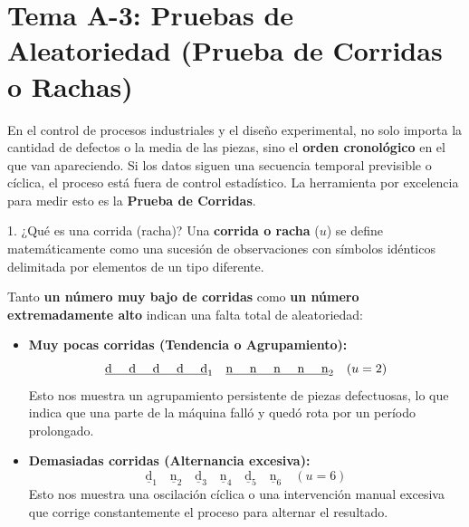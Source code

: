 \documentclass[11pt,a4paper]{article}
\begin{document}
\newpage
\section{Tema A-3: Pruebas de Aleatoriedad (Prueba de Corridas o Rachas)}

En el control de procesos industriales y el diseño experimental, no solo importa la cantidad de defectos o la media de las piezas, sino el \textbf{orden cronológico} en el que van apareciendo. Si los datos siguen una secuencia temporal previsible o cíclica, el proceso está fuera de control estadístico. La herramienta por excelencia para medir esto es la \textbf{Prueba de Corridas}.

\begin{subsection}{1. ¿Qué es una corrida (racha)?}
    Una \textbf{corrida o racha} ($u$) se define matemáticamente como una sucesión de observaciones con símbolos idénticos delimitada por elementos de un tipo diferente. 
    
    Tanto \textbf{un número muy bajo de corridas} como \textbf{un número extremadamente alto} indican una falta total de aleatoriedad:
    \begin{itemize}
        \item \textbf{Muy pocas corridas (Tendencia o Agrupamiento):} 
              \[ \underline{\text{d \quad d \quad d \quad d \quad d}}_{1} \quad \underline{\text{n \quad n \quad n \quad n \quad n}}_{2} \quad (u = 2) \]
              Esto nos muestra un agrupamiento persistente de piezas defectuosas, lo que indica que una parte de la máquina falló y quedó rota por un período prolongado.
        \item \textbf{Demasiadas corridas (Alternancia excesiva):} 
              \[ \underline{\text{d}}_{1} \quad \underline{\text{n}}_{2} \quad \underline{\text{d}}_{3} \quad \underline{\text{n}}_{4} \quad \underline{\text{d}}_{5} \quad \underline{\text{n}}_{6} \quad (u = 6) \]
              Esto nos muestra una oscilación cíclica o una intervención manual excesiva que corrige constantemente el proceso para alternar el resultado.
    \end{itemize}
\end{subsection}
\end{document}

